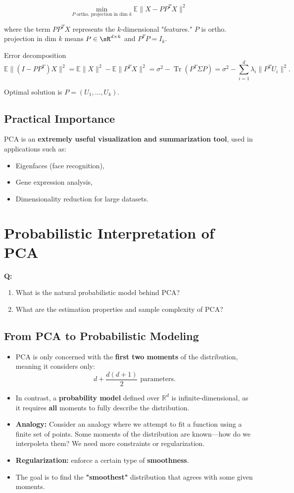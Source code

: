 \documentclass{article}
\begin{document}
\[
\min_{P \text{ ortho. projection in dim } k} \mathbb{E} \| X - P P^T X \|^2
\]

where the term \( P P^T X \) represents the \( k \)-dimensional "features." $P$ is ortho. projection in dim $k$ means $P\in\sR^{d\times k} $ and $P^T P=I_k$.


Error decomposition
\[
\mathbb{E} \| (I - P P^T) X \|^2 = \mathbb{E} \| X \|^2 - \mathbb{E} \| P^T X \|^2 = \sigma^2 - \operatorname{Tr} (P^T \Sigma P)=\sigma^2-\sum_{i=1}^{d} \lambda_i \| P^T U_i \|^2.
\]

Optimal solution is  $P=(U_1, \dots, U_k)$.


\subsection{Practical Importance}
PCA is an \textbf{extremely useful visualization and summarization tool}, used in applications such as:
\begin{itemize}
    \item Eigenfaces (face recognition),
    \item Gene expression analysis,
    \item Dimensionality reduction for large datasets.
\end{itemize}


\section{Probabilistic Interpretation of PCA}

\textbf{Q:}
\begin{enumerate}
    \item What is the natural probabilistic model behind PCA?
    \item What are the estimation properties and sample complexity of PCA?
\end{enumerate}

\subsection{From PCA to Probabilistic Modeling}
\begin{itemize}
    \item PCA is only concerned with the \textbf{first two moments} of the distribution, meaning it considers only:
    \[
    d + \frac{d(d+1)}{2} \text{ parameters.}
    \]
    \item In contrast, a \textbf{probability model} defined over \( \mathbb{R}^d \) is infinite-dimensional, as it requires \textbf{all} moments to fully describe the distribution.
    \item \textbf{Analogy: }
    Consider an analogy where we attempt to fit a function using a finite set of points. Some moments of the distribution are known—how do we interpoleta them? We need more constraints or regularization.
    \item \textbf{Regularization: }enforce a certain type of \textbf{smoothness}.
    \item The goal is to find the \textbf{"smoothest"} distribution that agrees with some given moments.
\end{itemize}
\end{document}
